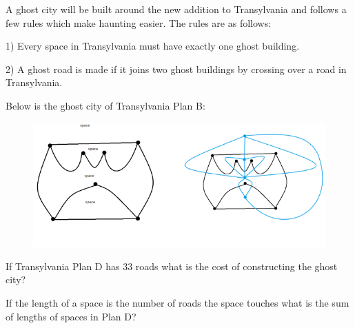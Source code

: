 


A ghost city will be built around the new addition to Transylvania and follows a few rules which make haunting easier. The rules are as follows:

1) Every space in Transylvania must have exactly one ghost building.

2) A ghost road is made if it joins two ghost buildings by crossing over a road in Transylvania.

Below is the ghost city of Transylvania Plan B:
\begin{figure}[h!]
\centering
\includegraphics[scale=.7]{assets/josh/ghostplans}
\end{figure}

If Transylvania Plan D has 33 roads what is the cost of constructing the ghost city?

If the length of a space is the number of roads the space touches what is the sum of lengths of spaces in Plan D?
